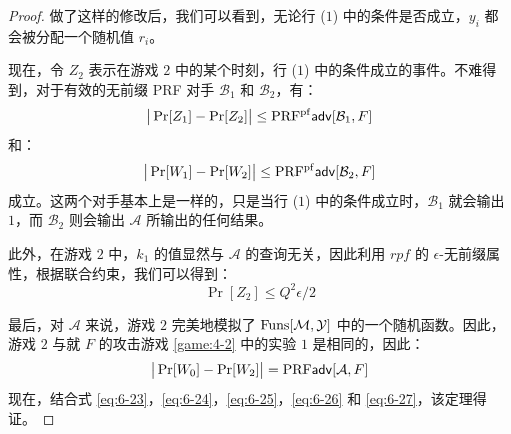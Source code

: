 \begin{proof}
\vspace{5pt}

\noindent
做了这样的修改后，我们可以看到，无论行 ($1$) 中的条件是否成立，$y_i$ 都会被分配一个随机值 $r_i$。

现在，令 $Z_2$ 表示在游戏 $2$ 中的某个时刻，行 ($1$) 中的条件成立的事件。不难得到，对于有效的无前缀 PRF 对手 $\mathcal{B}_1$ 和 $\mathcal{B}_2$，有：
\begin{equation}\label{eq:6-24}
\big\lvert\Pr[Z_1]-\Pr[Z_2]\big\rvert\leq{\rm PRF^{pf}}\mathsf{adv}[\mathcal{B}_1,F]
\end{equation}
和：
\begin{equation}\label{eq:6-25}
\big\lvert\Pr[W_1]-\Pr[W_2]\big\rvert\leq{\rm PRF^{pf}}\mathsf{adv}[\mathcal{B}_2,F]
\end{equation}
成立。这两个对手基本上是一样的，只是当行 ($1$) 中的条件成立时，$\mathcal{B}_1$ 就会输出 $1$，而 $\mathcal{B}_2$ 则会输出 $\mathcal{A}$ 所输出的任何结果。

此外，在游戏 $2$ 中，$k_1$ 的值显然与 $\mathcal{A}$ 的查询无关，因此利用 $rpf$ 的 $\epsilon$-无前缀属性，根据联合约束，我们可以得到：
\begin{equation}\label{eq:6-26}
\Pr[Z_2]\leq{Q^2\epsilon}/{2}
\end{equation}

最后，对 $\mathcal{A}$ 来说，游戏 $2$ 完美地模拟了 ${\rm Funs}[\mathcal{M},\mathcal{Y}]$ 中的一个随机函数。因此，游戏 $2$ 与就 $F$ 的攻击游戏 \ref{game:4-2} 中的实验 $1$ 是相同的，因此：
\begin{equation}\label{eq:6-27}
\big\lvert\Pr[W_0]-\Pr[W_2]\big\rvert={\rm PRF}\mathsf{adv}[\mathcal{A},F]
\end{equation}
现在，结合式 \ref{eq:6-23}，\ref{eq:6-24}，\ref{eq:6-25}，\ref{eq:6-26} 和 \ref{eq:6-27}，该定理得证。
\end{proof}